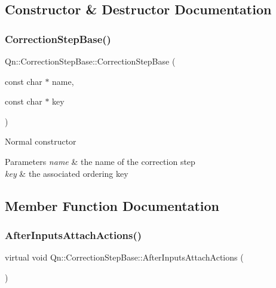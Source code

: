 \subsection{Constructor \& Destructor Documentation}
\mbox{\label{classQn_1_1CorrectionStepBase_a8e3446b2def1be06c0af8278f8bf2602}} 
\subsubsection{\texorpdfstring{Correction\+Step\+Base()}{CorrectionStepBase()}}
{\footnotesize\ttfamily Qn\+::\+Correction\+Step\+Base\+::\+Correction\+Step\+Base (\begin{DoxyParamCaption}\item[{const char $\ast$}]{name,  }\item[{const char $\ast$}]{key }\end{DoxyParamCaption})}

Normal constructor 
\begin{DoxyParams}{Parameters}
{\em name} & the name of the correction step \\
\hline
{\em key} & the associated ordering key \\
\hline
\end{DoxyParams}


\subsection{Member Function Documentation}
\mbox{\label{classQn_1_1CorrectionStepBase_a0c32c1fceb1f1be225ef0407a806f9e2}} 
\subsubsection{\texorpdfstring{After\+Inputs\+Attach\+Actions()}{AfterInputsAttachActions()}}
{\footnotesize\ttfamily virtual void Qn\+::\+Correction\+Step\+Base\+::\+After\+Inputs\+Attach\+Actions (\begin{DoxyParamCaption}{ }\end{DoxyParamCaption})\hspace{0.3cm}{\ttfamily [pure virtual]}}

